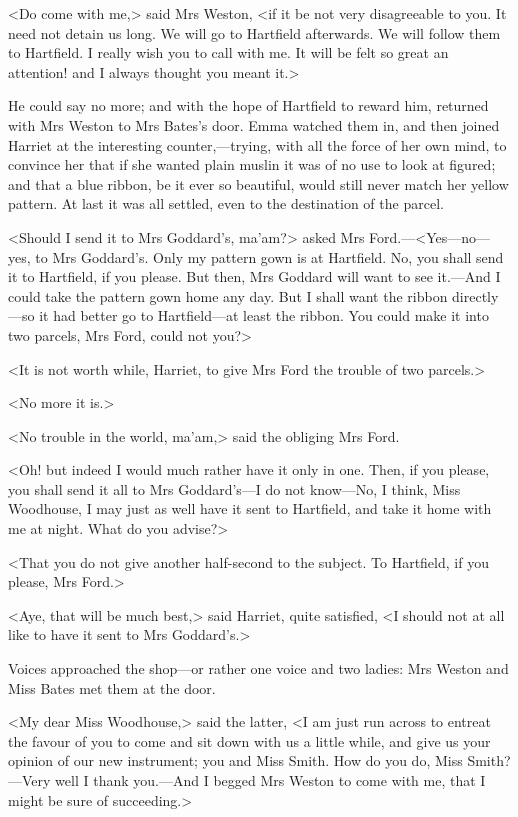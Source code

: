<Do come with me,> said Mrs Weston, <if it be not very disagreeable to you. It need not detain us long. We will go to Hartfield afterwards. We will follow them to Hartfield. I really wish you to call with me. It will be felt so great an attention! and I always thought you meant it.>

He could say no more; and with the hope of Hartfield to reward him, returned with Mrs Weston to Mrs Bates's door. Emma watched them in, and then joined Harriet at the interesting counter,—trying, with all the force of her own mind, to convince her that if she wanted plain muslin it was of no use to look at figured; and that a blue ribbon, be it ever so beautiful, would still never match her yellow pattern. At last it was all settled, even to the destination of the parcel.

<Should I send it to Mrs Goddard's, ma'am?> asked Mrs Ford.—<Yes—no—yes, to Mrs Goddard's. Only my pattern gown is at Hartfield. No, you shall send it to Hartfield, if you please. But then, Mrs Goddard will want to see it.—And I could take the pattern gown home any day. But I shall want the ribbon directly—so it had better go to Hartfield—at least the ribbon. You could make it into two parcels, Mrs Ford, could not you?>

<It is not worth while, Harriet, to give Mrs Ford the trouble of two parcels.>

<No more it is.>

<No trouble in the world, ma'am,> said the obliging Mrs Ford.

<Oh! but indeed I would much rather have it only in one. Then, if you please, you shall send it all to Mrs Goddard's—I do not know—No, I think, Miss Woodhouse, I may just as well have it sent to Hartfield, and take it home with me at night. What do you advise?>

<That you do not give another half-second to the subject. To Hartfield, if you please, Mrs Ford.>

<Aye, that will be much best,> said Harriet, quite satisfied, <I should not at all like to have it sent to Mrs Goddard's.>

Voices approached the shop—or rather one voice and two ladies: Mrs Weston and Miss Bates met them at the door.

<My dear Miss Woodhouse,> said the latter, <I am just run across to entreat the favour of you to come and sit down with us a little while, and give us your opinion of our new instrument; you and Miss Smith. How do you do, Miss Smith?—Very well I thank you.—And I begged Mrs Weston to come with me, that I might be sure of succeeding.>

